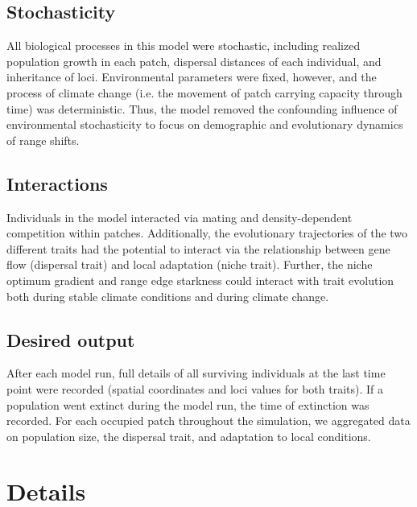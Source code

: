 \documentclass[11pt]{article}
\begin{document}
\subsection*{Stochasticity} 
All biological processes in this model were stochastic, including realized population growth in each patch, dispersal distances of each individual, and inheritance of loci. Environmental parameters were fixed, however, and the process of climate change (i.e. the movement of patch carrying capacity through time) was deterministic. Thus, the model removed the confounding influence of environmental stochasticity to focus on demographic and evolutionary dynamics of range shifts.

\subsection*{Interactions} 
Individuals in the model interacted via mating and density-dependent competition within patches. Additionally, the evolutionary trajectories of the two different traits had the potential to interact via the relationship between gene flow (dispersal trait) and local adaptation (niche trait). Further, the niche optimum gradient and range edge starkness could interact with trait evolution both during stable climate conditions and during climate change.

\subsection*{Desired output} 
After each model run, full details of all surviving individuals at the last time point were recorded (spatial coordinates and loci values for both traits). If a population went extinct during the model run, the time of extinction was recorded. For each occupied patch throughout the simulation, we aggregated data on population size, the dispersal trait, and adaptation to local conditions. 

\section*{Details}
\end{document}
